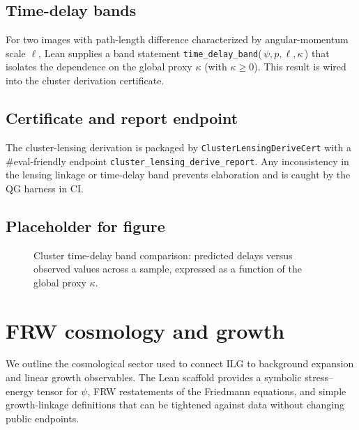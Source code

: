 \documentclass[aps,prd,twocolumn,superscriptaddress,nofootinbib,floatfix,longbibliography]{revtex4-2}
\newcommand{\lean}[1]{\texttt{#1}}
\begin{document}
\subsection{Time-delay bands}
For two images with path-length difference characterized by angular-momentum scale $\ell$, Lean supplies a band statement \lean{time_delay_band}(\,$\psi, p, \ell, \kappa$\,) that isolates the dependence on the global proxy $\kappa$ (with $\kappa\ge 0$). This result is wired into the cluster derivation certificate.

\subsection{Certificate and report endpoint}
The cluster-lensing derivation is packaged by \lean{ClusterLensingDeriveCert} with a \#eval-friendly endpoint \lean{cluster_lensing_derive_report}. Any inconsistency in the lensing linkage or time-delay band prevents elaboration and is caught by the QG harness in CI.

\subsection{Placeholder for figure}
\begin{figure}[t]
  \centering
  \caption{Cluster time-delay band comparison: predicted delays versus observed values across a sample, expressed as a function of the global proxy $\kappa$.}
  \label{fig:cluster-delays}
\end{figure}

\section{FRW cosmology and growth}\label{sec:frw}

We outline the cosmological sector used to connect ILG to background expansion and linear growth observables. The Lean scaffold provides a symbolic stress--energy tensor for $\psi$, FRW restatements of the Friedmann equations, and simple growth-linkage definitions that can be tightened against data without changing public endpoints.
\end{document}
